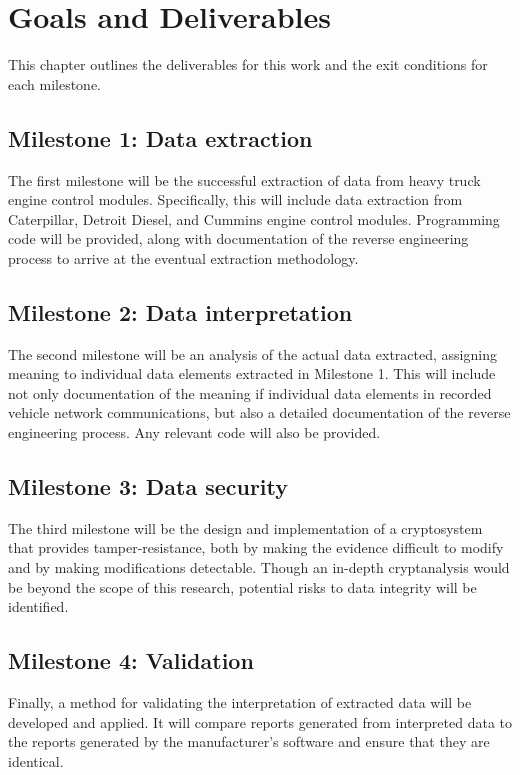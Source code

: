 \documentclass{report}
\begin{document}
\chapter{Goals and Deliverables}

This chapter outlines the deliverables for this work and the exit conditions for each milestone.

\section{Milestone 1: Data extraction}

The first milestone will be the successful extraction of data from heavy truck engine control modules. Specifically, this will include
data extraction from Caterpillar, Detroit Diesel, and Cummins engine control modules. Programming code will be provided, along with
documentation of the reverse engineering process to arrive at the eventual extraction methodology.

\section{Milestone 2: Data interpretation}

The second milestone will be an analysis of the actual data extracted, assigning meaning to individual data elements extracted in Milestone 1.
This will include not only documentation of the meaning if individual data elements in recorded vehicle network communications, but also
a detailed documentation of the reverse engineering process. Any relevant code will also be provided.


\section{Milestone 3: Data security}

The third milestone will be the design and implementation of a cryptosystem that provides tamper-resistance, both by making the evidence difficult to modify
and by making modifications detectable. Though an in-depth cryptanalysis would be beyond the scope of this research, potential risks to data integrity will
be identified.

\section{Milestone 4: Validation}

Finally, a method for validating the interpretation of extracted data will be developed and applied. It will compare reports generated from interpreted data to the
reports generated by the manufacturer's software and ensure that they are identical.
\end{document}
